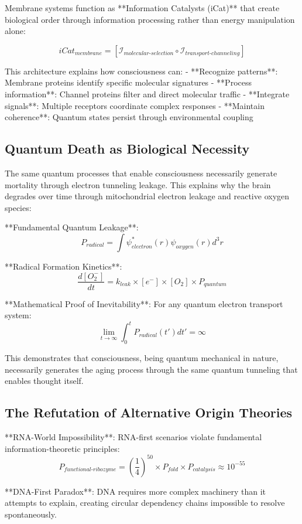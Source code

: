 \documentclass[12pt]{article}
\begin{document}
Membrane systems function as **Information Catalysts (iCat)** that create biological order through information processing rather than energy manipulation alone:

$$iCat_{membrane} = [\mathcal{I}_{molecular\text{-}selection} \circ \mathcal{I}_{transport\text{-}channeling}]$$

This architecture explains how consciousness can:
- **Recognize patterns**: Membrane proteins identify specific molecular signatures
- **Process information**: Channel proteins filter and direct molecular traffic
- **Integrate signals**: Multiple receptors coordinate complex responses
- **Maintain coherence**: Quantum states persist through environmental coupling

\subsection{Quantum Death as Biological Necessity}

The same quantum processes that enable consciousness necessarily generate mortality through electron tunneling leakage. This explains why the brain degrades over time through mitochondrial electron leakage and reactive oxygen species:

**Fundamental Quantum Leakage**:
$$P_{radical} = \int \psi_{electron}^*(r) \psi_{oxygen}(r) d^3r$$

**Radical Formation Kinetics**:
$$\frac{d[O_2^-]}{dt} = k_{leak} \times [e^-] \times [O_2] \times P_{quantum}$$

**Mathematical Proof of Inevitability**: For any quantum electron transport system:
$$\lim_{t \rightarrow \infty} \int_0^t P_{radical}(t') dt' = \infty$$

This demonstrates that consciousness, being quantum mechanical in nature, necessarily generates the aging process through the same quantum tunneling that enables thought itself.

\subsection{The Refutation of Alternative Origin Theories}

**RNA-World Impossibility**: RNA-first scenarios violate fundamental information-theoretic principles:
$$P_{functional\text{-}ribozyme} = \left(\frac{1}{4}\right)^{50} \times P_{fold} \times P_{catalysis} \approx 10^{-55}$$

**DNA-First Paradox**: DNA requires more complex machinery than it attempts to explain, creating circular dependency chains impossible to resolve spontaneously.
\end{document}
